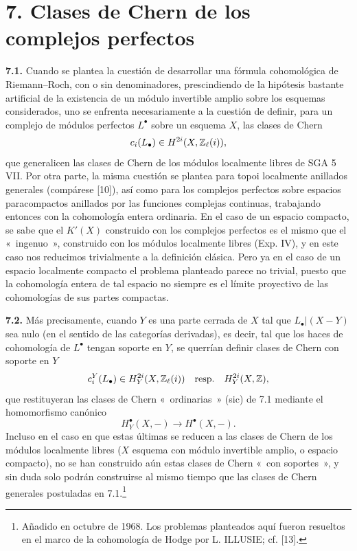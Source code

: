 
\section*{7. Clases de Chern de los complejos perfectos}

\textbf{7.1.} Cuando se plantea la cuestión de desarrollar una fórmula
cohomológica de Riemann--Roch, con o sin denominadores, prescindiendo de la
hipótesis bastante artificial de la existencia de un módulo invertible
amplio sobre los esquemas considerados, uno se enfrenta necesariamente a la
cuestión de definir, para un complejo de módulos perfectos $L^\bullet$ sobre
un esquema $X$, las clases de Chern
\[
 c_i(L_\bullet)\in H^{2i}(X,\mathbb Z_\ell(i)),
\]
que generalicen las clases de Chern de los módulos localmente libres de SGA
5 VII. Por otra parte, la misma cuestión se plantea para topoi localmente
anillados generales (compárese [10]), así como para los complejos perfectos
sobre espacios paracompactos anillados por las funciones complejas
continuas, trabajando entonces con la cohomología entera ordinaria. En el
caso de un espacio compacto, se sabe que el $K'(X)$ construido con los
complejos perfectos es el mismo que el «~ingenuo~», construido con los
módulos localmente libres (Exp. IV), y en este caso nos reducimos
trivialmente a la definición clásica. Pero ya en el caso de un espacio
localmente compacto el problema planteado parece no trivial, puesto que la
cohomología entera de tal espacio no siempre es el límite proyectivo de las
cohomologías de sus partes compactas.

\textbf{7.2.} Más precisamente, cuando $Y$ es una parte cerrada de $X$ tal
que $L_\bullet|(X-Y)$ sea nulo (en el sentido de las categorías derivadas),
es decir, tal que los haces de cohomología de $L^\bullet$ tengan soporte en
$Y$, se querrían definir clases de Chern con soporte en $Y$
\[
 c_i^Y(L_\bullet)\in H_Y^{2i}(X,\mathbb Z_\ell(i))\quad\text{resp.}\quad H_Y^{2i}(X,\mathbb Z),
\]
que restituyeran las clases de Chern «~ordinarias~» (sic) de 7.1 mediante el
homomorfismo canónico
\[
 H_Y^\bullet(X,-)\longrightarrow H^\bullet(X,-).
\]
Incluso en el caso en que estas últimas se reducen a las clases de Chern de
los módulos localmente libres ($X$ esquema con módulo invertible amplio, o
espacio compacto), no se han construido aún estas clases de Chern «~con
soportes~», y sin duda solo podrán construirse al mismo tiempo que las clases
de Chern generales postuladas en 7.1.\footnote{Añadido en octubre de 1968.
Los problemas planteados aquí fueron resueltos en el marco de la cohomología
de Hodge por L. ILLUSIE; cf. [13].}

